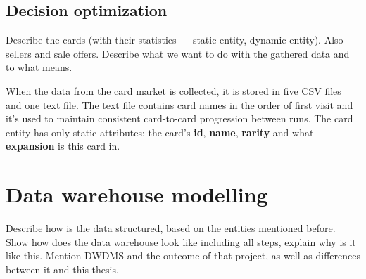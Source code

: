\subsection{Decision optimization}
Describe the cards (with their statistics --- static entity, dynamic entity). Also sellers and sale offers.
Describe what we want to do with the gathered data and to what means.

When the data from the card market is collected, it is stored in five CSV files and one text file. The text file contains card names in the order of first visit and it's used to maintain consistent card-to-card progression between runs. The card entity has only static attributes: the card's \textbf{id}, \textbf{name}, \textbf{rarity} and what \textbf{expansion} is this card in.


\section{Data warehouse modelling}
Describe how is the data structured, based on the entities mentioned before. Show how does the data warehouse look like including all steps, explain why is it like this. Mention DWDMS and the outcome of that project, as well as differences between it and this thesis.